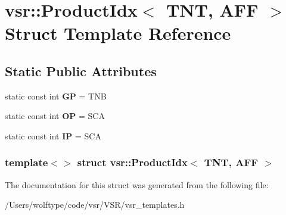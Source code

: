 \hypertarget{structvsr_1_1_product_idx_3_01_t_n_t_00_01_a_f_f_01_4}{\section{vsr\-:\-:Product\-Idx$<$ T\-N\-T, A\-F\-F $>$ Struct Template Reference}
\label{structvsr_1_1_product_idx_3_01_t_n_t_00_01_a_f_f_01_4}
}
\subsection*{Static Public Attributes}
\begin{DoxyCompactItemize}
\item 
\hypertarget{structvsr_1_1_product_idx_3_01_t_n_t_00_01_a_f_f_01_4_a2918779c97d82fa95163b106e191d223}{static const int {\bfseries G\-P} = T\-N\-B}\label{structvsr_1_1_product_idx_3_01_t_n_t_00_01_a_f_f_01_4_a2918779c97d82fa95163b106e191d223}

\item 
\hypertarget{structvsr_1_1_product_idx_3_01_t_n_t_00_01_a_f_f_01_4_a5c6f7b94cc0c12a4e3399d8227542dd5}{static const int {\bfseries O\-P} = S\-C\-A}\label{structvsr_1_1_product_idx_3_01_t_n_t_00_01_a_f_f_01_4_a5c6f7b94cc0c12a4e3399d8227542dd5}

\item 
\hypertarget{structvsr_1_1_product_idx_3_01_t_n_t_00_01_a_f_f_01_4_abe447f89d78d74eede55cd5f0b1ae92e}{static const int {\bfseries I\-P} = S\-C\-A}\label{structvsr_1_1_product_idx_3_01_t_n_t_00_01_a_f_f_01_4_abe447f89d78d74eede55cd5f0b1ae92e}

\end{DoxyCompactItemize}
\subsubsection*{template$<$$>$ struct vsr\-::\-Product\-Idx$<$ T\-N\-T, A\-F\-F $>$}



The documentation for this struct was generated from the following file\-:\begin{DoxyCompactItemize}
\item 
/\-Users/wolftype/code/vsr/\-V\-S\-R/vsr\-\_\-templates.\-h\end{DoxyCompactItemize}

